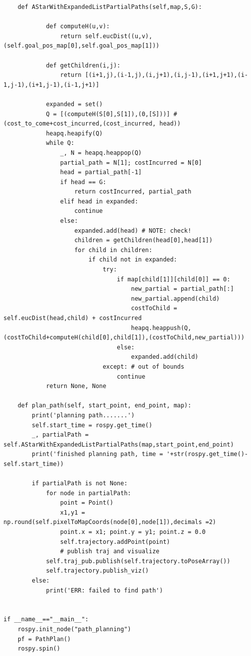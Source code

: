 \documentclass{article}
\begin{document}
{\begin{verbatim}
    def AStarWithExpandedListPartialPaths(self,map,S,G):
            
            def computeH(u,v): 
                return self.eucDist((u,v),(self.goal_pos_map[0],self.goal_pos_map[1]))
            
            def getChildren(i,j):
                return [(i+1,j),(i-1,j),(i,j+1),(i,j-1),(i+1,j+1),(i-1,j-1),(i+1,j-1),(i-1,j+1)]

            expanded = set()
            Q = [(computeH(S[0],S[1]),(0,[S]))] # (cost_to_come+cost_incurred,(cost_incurred, head))
            heapq.heapify(Q)
            while Q:
                _, N = heapq.heappop(Q)
                partial_path = N[1]; costIncurred = N[0]
                head = partial_path[-1]
                if head == G:
                    return costIncurred, partial_path
                elif head in expanded:
                    continue
                else:
                    expanded.add(head) # NOTE: check!
                    children = getChildren(head[0],head[1])
                    for child in children:
                        if child not in expanded:
                            try:
                                if map[child[1]][child[0]] == 0:
                                    new_partial = partial_path[:]
                                    new_partial.append(child)
                                    costToChild = self.eucDist(head,child) + costIncurred
                                    heapq.heappush(Q,(costToChild+computeH(child[0],child[1]),(costToChild,new_partial)))
                                else:
                                    expanded.add(child)
                            except: # out of bounds
                                continue             
            return None, None

    def plan_path(self, start_point, end_point, map):
        print('planning path.......')
        self.start_time = rospy.get_time()
        _, partialPath = self.AStarWithExpandedListPartialPaths(map,start_point,end_point)
        print('finished planning path, time = '+str(rospy.get_time()-self.start_time))
        
        if partialPath is not None:
            for node in partialPath:
                point = Point()
                x1,y1 = np.round(self.pixelToMapCoords(node[0],node[1]),decimals =2)
                point.x = x1; point.y = y1; point.z = 0.0
                self.trajectory.addPoint(point)
                # publish traj and visualize
            self.traj_pub.publish(self.trajectory.toPoseArray())
            self.trajectory.publish_viz()
        else:
            print('ERR: failed to find path')


if __name__=="__main__":
    rospy.init_node("path_planning")
    pf = PathPlan()
    rospy.spin()

\end{verbatim}
}
\end{document}
